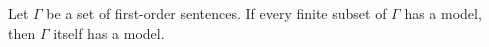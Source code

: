 Let $\Gamma$ be a set of first-order sentences. If every finite subset of $\Gamma$ has a model, then $\Gamma$ itself has a model.
